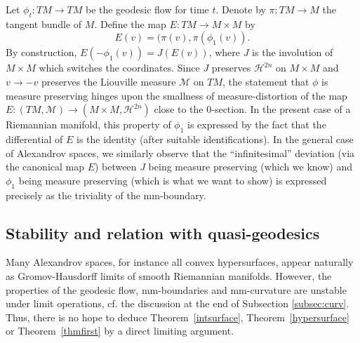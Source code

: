 \documentclass[12pt,leqno]{amsart}
\numberwithin{equation}{section}
\theoremstyle{definition}
\theoremstyle{remark}
\newcommand{\tref}[1]{Theorem~\ref{#1}}
\def\:{\colon}
\begin{document}
Let  $\phi_t\: TM\to TM$ be the geodesic flow for time $t$.
Denote by $\pi\: TM\to M$ the tangent bundle of $M$. Define the map $E\:TM\to M\times M$  by
\[E(v)=(\pi(v), \pi (\phi _1 (v)).\]
By construction, $E(-\phi_1(v))= J(E(v))$,
where $J$ is the involution of $M\times M$ which switches the coordinates.
Since $J$ preserves $\mathcal H^{2n}$ on $M\times M$ and $v\to -v$ preserves the Liouville measure $\mathcal M$ on $TM$,
the statement that $\phi$ is measure preserving hinges upon the smallness of measure-distortion of the map $E \:(TM,\mathcal M) \to (M\times M, \mathcal H^{2n})$ close to the $0$-section.
In the present case of a Riemannian manifold,
this property of $\phi_1$ is expressed by  the fact that the differential of $E$ is the identity (after suitable identifications).
In the general case of Alexandrov spaces, we similarly observe that the ``infinitesimal'' deviation (via the canonical map $E$) between $J$ being measure preserving (which we know) and  $\phi _1$ being measure preserving (which is what we want to show)
is expressed precisely as the triviality of  the mm-boundary.











\subsection{Stability and relation with quasi-geodesics}
Many Alexandrov spaces, for instance all convex hypersurfaces, appear naturally  as Gromov-Hausdorff limits of smooth Riemannian manifolds. However, the properties of the geodesic flow, mm-boundaries and mm-curvature are  unstable under limit operations, cf. the discussion at the end of Subsection \ref{subsec:curv}. Thus, there is no hope to deduce \tref{intsurface}, \tref{hypersurface} or \tref{thmfirst} by a direct limiting argument.
\end{document}
